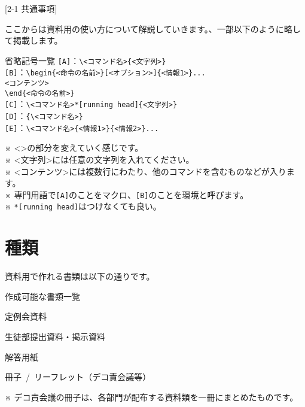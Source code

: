 \newpage
\pagestyle{leaflet}
[2-1 共通事項]
\begin{multicols*}{2}
ここからは資料用\BunTeX の使い方について解説していきます。、一部以下のように略して掲載します。

\begin{framebox-simple}{省略記号一覧}
\noindent\verb|[A]|：\verb|\<コマンド名>{<文字列>}|\\
\noindent\verb|[B]|：\verb|\begin{<命令の名前>}[<オプション>]{<情報1>}...|\\\hspace{4.5\zw}\verb|<コンテンツ>|\\\hspace{2.4\zw}\verb|\end{<命令の名前>}|\\
\noindent\verb|[C]|：\verb|\<コマンド名>*[running head]{<文字列>}|\\
\noindent\verb|[D]|：\verb|{\<コマンド名>}|\\
\noindent\verb|[E]|：\verb|\<コマンド名>{<情報1>}{<情報2>}...|
\end{framebox-simple}
\noindent ※ <>の部分を変えていく感じです。\\
\noindent ※ <文字列>には任意の文字列を入れてください。\\
\noindent ※ <コンテンツ>には複数行にわたり、他のコマンドを含むものなどが入ります。\\
\noindent ※ 専門用語で\verb|[A]|のことをマクロ、\verb|[B]|のことを環境と呼びます。\\
\noindent ※ \verb|*[running head]|はつけなくても良い。

\section{種類}
資料用\BunTeX で作れる書類は以下の通りです。
\begin{framebox-simple}{作成可能な書類一覧}
    \begin{reitemize}
        \item 定例会資料
        \item 生徒部提出資料・掲示資料
        \item 解答用紙
        \item 冊子~/~リーフレット（デコ責会議等）
    \end{reitemize}
\end{framebox-simple}
\indent ※ デコ責会議の冊子は、各部門が配布する資料類を一冊にまとめたものです。


\end{multicols*}
